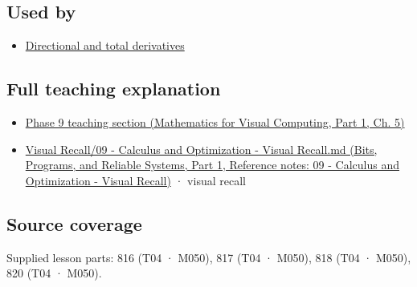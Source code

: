 \subsection{Used by}\label{appendix-677b59746ae0-used-by}

\hypertarget{appendix-677b59746ae0-used-by}{}

\begin{itemize}
\tightlist
\item
  \hyperref[appendix-e2d476574aab]{Directional and total derivatives}
\end{itemize}

\subsection{Full teaching explanation}\label{appendix-677b59746ae0-full-teaching-explanation}

\hypertarget{appendix-677b59746ae0-full-teaching-explanation}{}

\begin{itemize}
\tightlist
\item
  \href{../02-Mathematics-for-Visual-Computing-P01/main.pdf\#nameddest=02-foundations-ii-ch021-multivariable-derivatives-and-sensitivity-1}{Phase 9 teaching section (Mathematics for Visual Computing, Part 1, Ch. 5)}
\item
  \href{../01-Bits-Programs-and-Reliable-Systems-P01/main.pdf\#nameddest=appendix-adf48f5dc5c1}{Visual Recall/09 - Calculus and Optimization - Visual Recall.md (Bits, Programs, and Reliable Systems, Part 1, Reference notes: 09 - Calculus and Optimization - Visual Recall)} · visual recall
\end{itemize}

\subsection{Source coverage}\label{appendix-677b59746ae0-source-coverage}

\hypertarget{appendix-677b59746ae0-source-coverage}{}

Supplied lesson parts: 816 (T04 · M050), 817 (T04 · M050), 818 (T04 · M050), 820 (T04 · M050).
